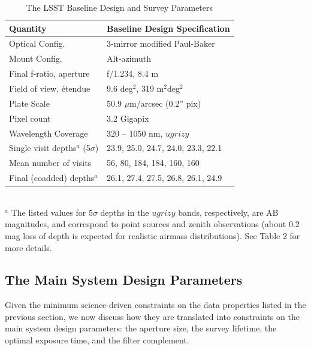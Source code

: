 \documentclass{emulateapj}
\begin{document}
\begin{table}
\caption{The LSST Baseline Design and Survey Parameters}
\begin{tabular}{|l|l|}
\hline  
   Quantity                         &     Baseline Design Specification    \\
\hline  
Optical Config.                     &  3-mirror modified Paul-Baker        \\
Mount Config.                       &  Alt-azimuth          \\
Final f-ratio, aperture             &  f/1.234, 8.4 m                \\
Field of view, \'etendue            &  9.6 deg$^2$,   319 m$^2$deg$^2$     \\
Plate Scale                         &  50.9 $\mu$m/arcsec (0.2'' pix)  \\
Pixel count                         &  3.2 Gigapix  \\
Wavelength Coverage                 &  320 -- 1050 nm, $ugrizy$                        \\
Single visit depths$^a$ (5$\sigma$) &  23.9, 25.0, 24.7, 24.0, 23.3, 22.1  \\
Mean number of visits               &  56, 80, 184, 184, 160, 160  \\ 
Final (coadded) depths$^a$          &  26.1, 27.4, 27.5, 26.8, 26.1, 24.9 \\
\hline                         
\end{tabular}
\\ \vskip 0.05in
$^a$ The listed values for 5$\sigma$ depths in the $ugrizy$ bands, respectively, 
are AB magnitudes, and correspond to point sources and zenith observations
(about 0.2 mag loss of depth is expected for realistic airmass distributions). 
See Table 2 for more details.   
\vskip 0.2in          
\end{table}



\subsection{The Main System Design Parameters} 

Given the minimum science-driven constraints on the data properties listed 
in the previous section, we now discuss how they are translated into
constraints on the main system design parameters: the aperture size, 
the survey lifetime, the optimal exposure time, and the filter complement. 
\end{document}
